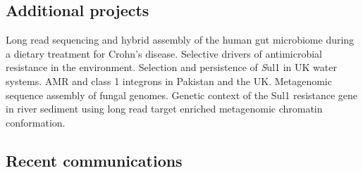\documentclass[hidelinks]{james-cv} %
\begin{document}

\begin{aside2}
\color{gray}\headingfont\justify
\section{Additional projects}
\emergencystretch=15pt\justify\normalsize\bodyfontcontact\color{gray} Long read sequencing and hybrid assembly of the human gut microbiome during a dietary treatment for Crohn's disease.
\emergencystretch=15pt\justify\normalsize\bodyfontcontact\color{gray} Selective drivers of antimicrobial resistance in the environment.
\emergencystretch=15pt\justify\normalsize\bodyfontcontact\color{gray} Selection and persistence of \textit Sul1 \textrm in UK water systems.
\emergencystretch=15pt\justify\normalsize\bodyfontcontact\color{gray} AMR and class 1 integrons in Pakistan and the UK.
\emergencystretch=15pt\justify\normalsize\bodyfontcontact\color{gray} Metagenomic sequence assembly of fungal genomes.
\emergencystretch=15pt\justify\normalsize\bodyfontcontact\color{gray} Genetic context of the Sul1 resistance gene in river sediment using long read target enriched metagenomic chromatin conformation.

\end{aside2}

\subsection{Recent communications}
\end{document}
